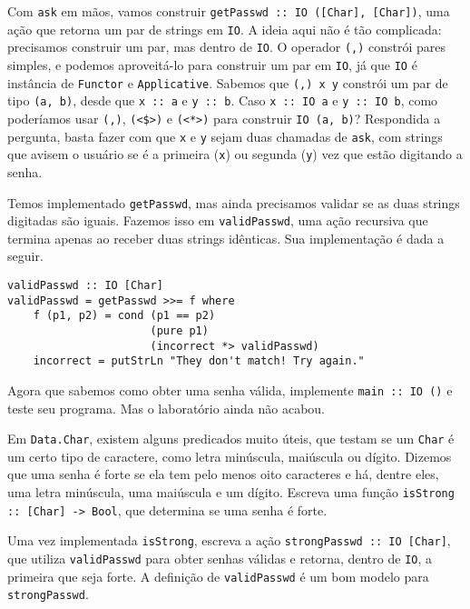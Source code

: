 \documentclass[a4paper]{article}
\begin{document}
Com \texttt{ask} em mãos, vamos construir \texttt{getPasswd :: IO ([Char], [Char])}, uma ação que retorna um par de strings em \texttt{IO}.
A ideia aqui não é tão complicada: precisamos construir um par, mas dentro de \texttt{IO}.
O operador \texttt{(,)} constrói pares simples, e podemos aproveitá-lo para construir um par em \texttt{IO}, já que \texttt{IO} é instância de \texttt{Functor} e \texttt{Applicative}.
Sabemos que \mbox{\texttt{(,) x y}} constrói um par de tipo \texttt{(a, b)}, desde que \texttt{x :: a} e \texttt{y :: b}.
Caso \mbox{\texttt{x :: IO a}} e \mbox{\texttt{y :: IO b}}, como poderíamos usar \texttt{(,)}, \texttt{(<\$>)} e \texttt{(<*>)} para construir \texttt{IO (a, b)}?
Respondida a pergunta, basta fazer com que \texttt{x} e \texttt{y} sejam duas chamadas de \texttt{ask}, com strings que avisem o usuário se é a primeira (\texttt{x}) ou segunda (\texttt{y}) vez que estão digitando a senha.

Temos implementado \texttt{getPasswd}, mas ainda precisamos validar se as duas strings digitadas são iguais.
Fazemos isso em \texttt{validPasswd}, uma ação recursiva que termina apenas ao receber duas strings idênticas.
Sua implementação é dada a seguir.

\pagebreak

\begin{verbatim}
validPasswd :: IO [Char]
validPasswd = getPasswd >>= f where
    f (p1, p2) = cond (p1 == p2)
                      (pure p1)
                      (incorrect *> validPasswd)
    incorrect = putStrLn "They don't match! Try again."
\end{verbatim}

Agora que sabemos como obter uma senha válida, implemente \texttt{main :: IO ()} e teste seu programa.
Mas o laboratório ainda não acabou.

Em \texttt{Data.Char}, existem alguns predicados muito úteis, que testam se um \texttt{Char} é um certo tipo de caractere, como letra minúscula, maiúscula ou dígito.
Dizemos que uma senha é forte se ela tem pelo menos oito caracteres e há, dentre eles, uma letra minúscula, uma maiúscula e um dígito.
Escreva uma função \texttt{isStrong :: [Char] -> Bool}, que determina se uma senha é forte.

Uma vez implementada \texttt{isStrong}, escreva a ação \texttt{strongPasswd :: IO [Char]}, que utiliza \texttt{validPasswd} para obter senhas válidas e retorna, dentro de \texttt{IO}, a primeira que seja forte.
A definição de \texttt{validPasswd} é um bom modelo para \texttt{strongPasswd}.
\end{document}
